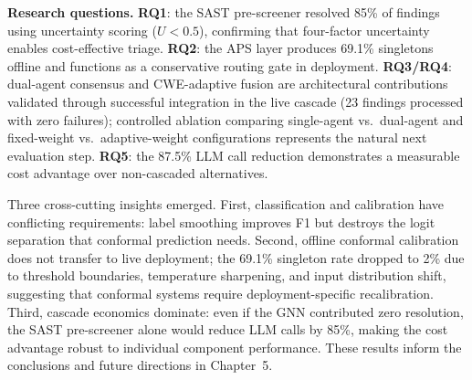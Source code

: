 \textbf{Research questions.} \textbf{RQ1}: the SAST pre-screener resolved 85\% of findings using uncertainty scoring ($U < 0.5$), confirming that four-factor uncertainty enables cost-effective triage. \textbf{RQ2}: the APS layer produces 69.1\% singletons offline and functions as a conservative routing gate in deployment. \textbf{RQ3/RQ4}: dual-agent consensus and CWE-adaptive fusion are architectural contributions validated through successful integration in the live cascade (23 findings processed with zero failures); controlled ablation comparing single-agent vs.\ dual-agent and fixed-weight vs.\ adaptive-weight configurations represents the natural next evaluation step. \textbf{RQ5}: the 87.5\% LLM call reduction demonstrates a measurable cost advantage over non-cascaded alternatives.

Three cross-cutting insights emerged. First, classification and calibration have conflicting requirements: label smoothing improves F1 but destroys the logit separation that conformal prediction needs. Second, offline conformal calibration does not transfer to live deployment; the 69.1\% singleton rate dropped to 2\% due to threshold boundaries, temperature sharpening, and input distribution shift, suggesting that conformal systems require deployment-specific recalibration. Third, cascade economics dominate: even if the GNN contributed zero resolution, the SAST pre-screener alone would reduce LLM calls by 85\%, making the cost advantage robust to individual component performance. These results inform the conclusions and future directions in Chapter~5.
